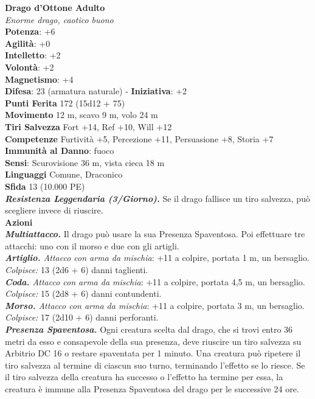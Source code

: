 \begin{multicols}{2}
\medskip\textbf{Drago d'Ottone Adulto}\\
\emph{Enorme drago, caotico buono}\\
\textbf{Potenza}: +6\\
\textbf{Agilità}: +0\\
\textbf{Intelletto}: +2\\
\textbf{Volontà}: +2\\
\textbf{Magnetismo}: +4\\
\textbf{Difesa}: 23 (armatura naturale) - \textbf{Iniziativa}: +2\\
\textbf{Punti Ferita} 172 (15d12 + 75)\\
\textbf{Movimento} 12 m, scavo 9 m, volo 24 m\\
\textbf{Tiri Salvezza} Fort +14, Ref +10, Will +12\\
\textbf{Competenze} Furtività +5, Percezione +11, Persuasione +8, Storia +7\\
\textbf{Immunità al Danno}: fuoco\\
\textbf{Sensi}: Scurovisione 36 m, vista cieca 18 m\\
\textbf{Linguaggi} Comune, Draconico\\
\textbf{Sfida} 13 (10.000 PE)\smallskip\\
\emph{\textbf{Resistenza Leggendaria (3/Giorno).}} Se il drago fallisce un tiro salvezza, può scegliere invece di riuscire.\\
\smallskip\textbf{Azioni}\\
\emph{\textbf{Multiattacco.}} Il drago può usare la sua Presenza Spaventosa. Poi effettuare tre attacchi: uno con il morso e due con gli artigli.\\
\emph{\textbf{Artiglio.} Attacco con arma da mischia}: +11 a colpire, portata 1 m, un bersaglio.\\
\emph{Colpisce:} 13 (2d6 + 6) danni taglienti.\\
\emph{\textbf{Coda.} Attacco con arma da mischia}: +11 a colpire, portata 4,5 m, un bersaglio.\\
\emph{Colpisce:} 15 (2d8 + 6) danni contundenti.\\
\emph{\textbf{Morso.} Attacco con arma da mischia}: +11 a colpire, portata 3 m, un bersaglio.\\
\emph{Colpisce:} 17 (2d10 + 6) danni perforanti.\\
\emph{\textbf{Presenza Spaventosa.}} Ogni creatura scelta dal drago, che si trovi entro 36 metri da esso e consapevole della sua presenza, deve riuscire un tiro salvezza su Arbitrio DC 16 o restare spaventata per 1 minuto. Una creatura può ripetere il tiro salvezza al termine di ciascun suo turno, terminando l'effetto se lo riesce. Se il tiro salvezza della creatura ha successo o l'effetto ha termine per essa, la creatura è immune alla Presenza Spaventosa del drago per le successive 24 ore.\\

\end{multicols}

